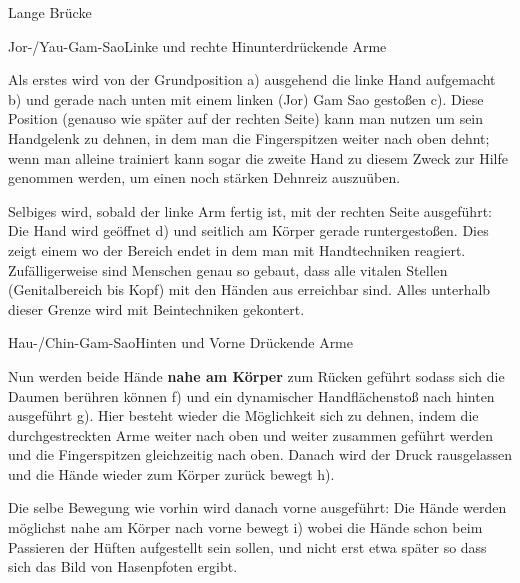 \begin{WTSatz}{Lange Br\"ucke}%

	
	\begin{WTSatzTeil}{Jor-/Yau-Gam-Sao}{Linke und rechte Hinunterdr\"uckende Arme}
		
		Als erstes wird von der Grundposition a) ausgehend die linke Hand aufgemacht b) und gerade nach unten mit einem linken (Jor) Gam Sao gesto{\ss}en c). Diese Position (genauso wie sp\"ater auf der rechten Seite) kann man nutzen um sein Handgelenk zu dehnen, in dem man die Fingerspitzen weiter nach oben dehnt; wenn man alleine trainiert kann sogar die zweite Hand zu diesem Zweck zur Hilfe genommen werden, um einen noch st\"arken Dehnreiz auszu\"uben.
		
		
		Selbiges wird, sobald der linke Arm fertig ist, mit der rechten Seite ausgef\"uhrt: Die Hand wird ge\"offnet d) und seitlich am K\"orper gerade runtergesto{\ss}en. Dies zeigt einem wo der Bereich endet in dem man mit Handtechniken reagiert. Zuf\"alligerweise sind Menschen genau so gebaut, dass alle vitalen Stellen (Genitalbereich bis Kopf) mit den H\"anden aus erreichbar sind. Alles unterhalb dieser Grenze wird mit Beintechniken gekontert.
		
	\end{WTSatzTeil}
	\begin{WTSatzTeil}{Hau-/Chin-Gam-Sao}{Hinten und Vorne Dr\"uckende Arme}
		
		Nun werden beide H\"ande \textbf{nahe am K\"orper} zum R\"ucken gef\"uhrt sodass sich die Daumen ber\"uhren k\"onnen f) und ein dynamischer Handfl\"achensto{\ss} nach hinten ausgef\"uhrt g). Hier besteht wieder die M\"oglichkeit sich zu dehnen, indem die durchgestreckten Arme weiter nach oben und weiter zusammen gef\"uhrt werden und die Fingerspitzen gleichzeitig nach oben. Danach wird der Druck rausgelassen und die H\"ande wieder zum K\"orper zur\"uck bewegt h).
		
		
		Die selbe Bewegung wie vorhin wird danach vorne ausgef\"uhrt: Die H\"ande werden m\"oglichst nahe am K\"orper nach vorne bewegt i) wobei die H\"ande schon beim Passieren der H\"uften aufgestellt sein sollen, und nicht erst etwa sp\"ater so dass sich das Bild von Hasenpfoten ergibt.
		

\end{WTSatzTeil}
\end{WTSatz}
